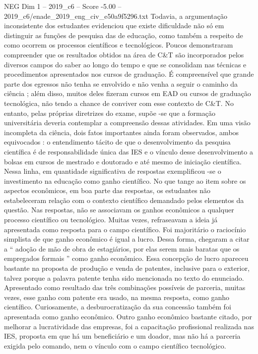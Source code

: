 \begin{textsample}{NEG Dim 1 – 2019\_c6 – Score -5.00 – 2019\_c6/enade\_2019\_eng\_civ\_e50a9f5296.txt}
Todavia, a argumentação inconsistente dos estudantes evidenciou que existe dificuldade não só em distinguir as funções de pesquisa das de educação, como também a respeito de como ocorrem os processos científicos e tecnológicos.
Poucos demonstraram compreender que os resultados obtidos na área de C\&T são incorporados pelos diversos campos do saber ao longo do tempo e que se consolidam nas técnicas e procedimentos apresentados nos cursos de graduação.
É compreensível que grande parte dos egressos não tenha se envolvido e não venha a seguir o caminho da ciência ; além disso, muitos deles fizeram cursos em EAD ou cursos de graduação tecnológica, não tendo a chance de conviver com esse contexto de C\&T.
No entanto, pelas próprias diretrizes do exame, supõe -se que a formação universitária deveria contemplar a compreensão dessas atividades.
Em uma visão incompleta da ciência, dois fatos importantes ainda foram observados, ambos equivocados : o entendimento tácito de que o desenvolvimento da pesquisa científica é de responsabilidade única das IES e o vínculo desse desenvolvimento a bolsas em cursos de mestrado e doutorado e até mesmo de iniciação científica.
Nessa linha, em quantidade significativa de respostas exemplificou -se o investimento na educação como ganho científico.
No que tange ao item sobre os aspectos econômicos, em boa parte das respostas, os estudantes não estabeleceram relação com o contexto científico demandado pelos elementos da questão.
Nas respostas, não se associavam os ganhos econômicos a qualquer processo científico ou tecnológico.
Muitas vezes, refraseavam a ideia já apresentada como resposta para o campo científico.
Foi majoritário o raciocínio simplista de que ganho econômico é igual a lucro.
Dessa forma, chegaram a citar a “ adoção de mão de obra de estagiários, por elas serem mais baratas que os empregados formais ” como ganho econômico.
Essa concepção de lucro apareceu bastante na proposta de produção e venda de patentes, inclusive para o exterior, talvez porque a palavra patente tenha sido mencionada no texto do enunciado.
Apresentado como resultado das três combinações possíveis de parceria, muitas vezes, esse ganho com patente era usado, na mesma resposta, como ganho científico.
Curiosamente, a desburocratização da sua concessão também foi apresentada como ganho econômico.
Outro ganho econômico bastante citado, por melhorar a lucratividade das empresas, foi a capacitação profissional realizada nas IES, proposta em que há um beneficiário e um doador, mas não há a parceria exigida pelo comando, nem o vínculo com o campo científico tecnológico.

\end{textsample}
